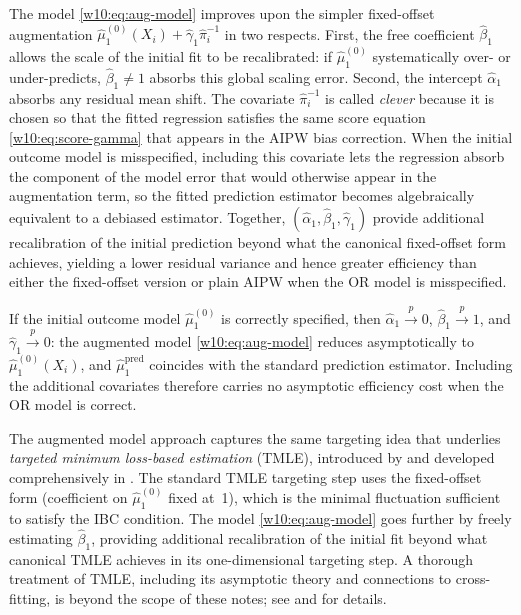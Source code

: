 \documentclass[master.tex]{subfiles}
\begin{document}
The model \eqref{w10:eq:aug-model} improves upon the simpler
fixed-offset augmentation $\hat\mu_1^{(0)}(X_i) + \hat\gamma_1\hat\pi_i^{-1}$
in two respects.  First, the free coefficient $\hat\beta_1$ allows
the scale of the initial fit to be recalibrated: if
$\hat\mu_1^{(0)}$ systematically over- or under-predicts, $\hat\beta_1
\neq 1$ absorbs this global scaling error.  Second, the intercept
$\hat\alpha_1$ absorbs any residual mean shift.  The covariate
$\hat\pi_i^{-1}$ is called \emph{clever} because it is chosen so
that the fitted regression satisfies the same score equation
\eqref{w10:eq:score-gamma} that appears in the AIPW bias correction.
When the initial outcome model is misspecified, including this
covariate lets the regression absorb the component of the
model error that would otherwise appear in the augmentation term, so
the fitted prediction estimator becomes algebraically equivalent to a
debiased estimator.  Together, $(\hat\alpha_1, \hat\beta_1,
\hat\gamma_1)$ provide additional recalibration of the initial
prediction beyond what the canonical fixed-offset form achieves,
yielding a lower residual variance and hence greater efficiency than
either the fixed-offset version or plain AIPW when the OR model is
misspecified.

\begin{remark}
\label{w10:rem:gamma-zero}
If the initial outcome model $\hat\mu_1^{(0)}$ is correctly
specified, then $\hat\alpha_1 \overset{p}{\to} 0$,
$\hat\beta_1 \overset{p}{\to} 1$, and
$\hat\gamma_1 \overset{p}{\to} 0$: the augmented model
\eqref{w10:eq:aug-model} reduces asymptotically to
$\hat\mu_1^{(0)}(X_i)$, and $\hat\mu_1^{\mathrm{pred}}$ coincides
with the standard prediction estimator.  Including the additional
covariates therefore carries no asymptotic efficiency cost when the
OR model is correct.
\end{remark}

\begin{remark}
\label{w10:rem:tmle}
The augmented model approach captures the same targeting idea that
underlies \emph{targeted minimum loss-based estimation} (TMLE),
introduced by \citet{vanderLaan2006targeted} and developed
comprehensively in \citet{vanderLaan2011targeted}.  The standard TMLE
targeting step uses the fixed-offset form (coefficient on
$\hat\mu_1^{(0)}$ fixed at~1), which is the minimal fluctuation
sufficient to satisfy the IBC condition.  The model
\eqref{w10:eq:aug-model} goes further by freely estimating
$\hat\beta_1$, providing additional recalibration of the initial fit
beyond what canonical TMLE achieves in its one-dimensional targeting
step.  A thorough treatment of TMLE, including its asymptotic theory
and connections to cross-fitting, is beyond the scope of these notes;
see \citet{vanderLaan2011targeted} and \citet{rose2020targeted} for
details.
\end{remark}
\end{document}
